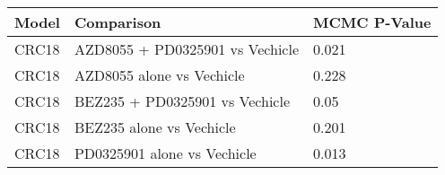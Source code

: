 \begin{table}[ht]
\centering
\begin{tabular}{lll}
  \hline
Model & Comparison & MCMC P-Value \\ 
  \hline
CRC18 & AZD8055 + PD0325901 vs Vechicle & 0.021 \\ 
  CRC18 & AZD8055 alone vs Vechicle & 0.228 \\ 
  CRC18 & BEZ235 + PD0325901 vs Vechicle & 0.05 \\ 
  CRC18 & BEZ235 alone vs Vechicle & 0.201 \\ 
  CRC18 & PD0325901 alone vs Vechicle & 0.013 \\ 
   \hline
\end{tabular}
\end{table}
